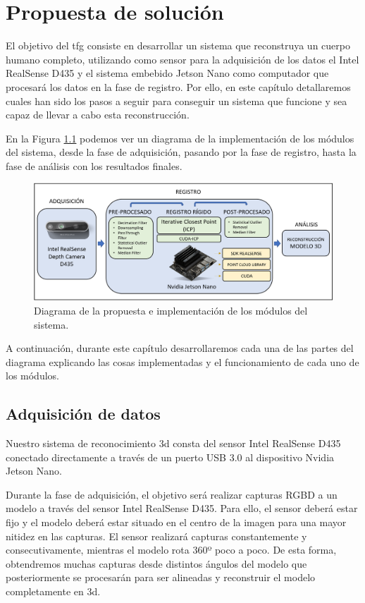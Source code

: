 \chapter{Propuesta de solución}
\label{cap:propuesta-de-solucion}

El objetivo del \gls{tfg} consiste en desarrollar un sistema que reconstruya un cuerpo humano completo, utilizando como sensor para la adquisición de los datos el Intel RealSense D435 y el sistema embebido Jetson Nano como computador que procesará los datos en la fase de registro.
Por ello, en este capítulo detallaremos cuales han sido los pasos a seguir para conseguir un sistema que funcione y sea capaz de llevar a cabo esta reconstrucción.

En la Figura \ref{fig:diagrama-propuesta-solucion} podemos ver un diagrama de la implementación de los módulos del sistema, desde la fase de adquisición, pasando por la fase de registro, hasta la fase de análisis con los resultados finales.

\begin{figure}[h]
    \centering
    \includegraphics[width=\textwidth]{archivos/diagrama-propuesta-solucion.png}
    \caption{Diagrama de la propuesta e implementación de los módulos del sistema.}
    \label{fig:diagrama-propuesta-solucion}
\end{figure}

A continuación, durante este capítulo desarrollaremos cada una de las partes del diagrama explicando las cosas implementadas y el funcionamiento de cada uno de los módulos.

\section{Adquisición de datos}

Nuestro sistema de reconocimiento \gls{3d} consta del sensor Intel RealSense D435 conectado directamente a través de un puerto USB 3.0 al dispositivo Nvidia Jetson Nano.

Durante la fase de adquisición, el objetivo será realizar capturas RGBD a un modelo a través del sensor Intel RealSense D435.
Para ello, el sensor deberá estar fijo y el modelo deberá estar situado en el centro de la imagen para una mayor nitidez en las capturas.
El sensor realizará capturas constantemente y consecutivamente, mientras el modelo rota 360º poco a poco.
De esta forma, obtendremos muchas capturas desde distintos ángulos del modelo que posteriormente se procesarán para ser alineadas y reconstruir el modelo completamente en \gls{3d}.

